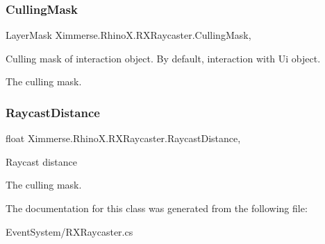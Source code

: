 \subsubsection{\texorpdfstring{Culling\+Mask}{CullingMask}}
{\footnotesize\ttfamily Layer\+Mask Ximmerse.\+Rhino\+X.\+R\+X\+Raycaster.\+Culling\+Mask\hspace{0.3cm}{\ttfamily [get]}, {\ttfamily [set]}}



Culling mask of interaction object. By default, interaction with Ui object. 

The culling mask.\mbox{\label{class_ximmerse_1_1_rhino_x_1_1_r_x_raycaster_a122146e73455860e6aaf030211fe948c}} 
\subsubsection{\texorpdfstring{Raycast\+Distance}{RaycastDistance}}
{\footnotesize\ttfamily float Ximmerse.\+Rhino\+X.\+R\+X\+Raycaster.\+Raycast\+Distance\hspace{0.3cm}{\ttfamily [get]}, {\ttfamily [set]}}



Raycast distance 

The culling mask.

The documentation for this class was generated from the following file\+:\begin{DoxyCompactItemize}
\item 
Event\+System/R\+X\+Raycaster.\+cs\end{DoxyCompactItemize}
